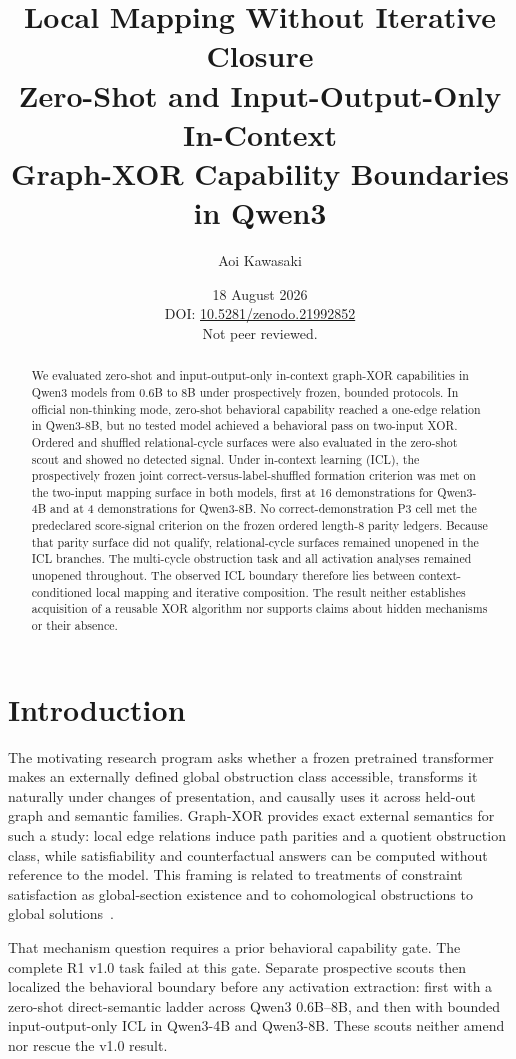 \documentclass[10pt,a4paper]{article}
\title{\textbf{Local Mapping Without Iterative Closure}\\[4pt]
\large Zero-Shot and Input-Output-Only In-Context\\
Graph-XOR Capability Boundaries in Qwen3}
\author{Aoi Kawasaki}
\date{18 August 2026\\
\small DOI: \href{https://doi.org/10.5281/zenodo.21992852}{10.5281/zenodo.21992852}\\
\small Not peer reviewed.}
\begin{document}
\maketitle

\begin{abstract}
We evaluated zero-shot and input-output-only in-context graph-XOR capabilities in Qwen3 models from 0.6B to 8B under prospectively frozen, bounded protocols. In official non-thinking mode, zero-shot behavioral capability reached a one-edge relation in Qwen3-8B, but no tested model achieved a behavioral pass on two-input XOR. Ordered and shuffled relational-cycle surfaces were also evaluated in the zero-shot scout and showed no detected signal. Under in-context learning (ICL), the prospectively frozen joint correct-versus-label-shuffled formation criterion was met on the two-input mapping surface in both models, first at 16 demonstrations for Qwen3-4B and at 4 demonstrations for Qwen3-8B. No correct-demonstration P3 cell met the predeclared score-signal criterion on the frozen ordered length-8 parity ledgers. Because that parity surface did not qualify, relational-cycle surfaces remained unopened in the ICL branches. The multi-cycle obstruction task and all activation analyses remained unopened throughout. The observed ICL boundary therefore lies between context-conditioned local mapping and iterative composition. The result neither establishes acquisition of a reusable XOR algorithm nor supports claims about hidden mechanisms or their absence.
\end{abstract}

\section{Introduction}

The motivating research program asks whether a frozen pretrained transformer makes an externally defined global obstruction class accessible, transforms it naturally under changes of presentation, and causally uses it across held-out graph and semantic families. Graph-XOR provides exact external semantics for such a study: local edge relations induce path parities and a quotient obstruction class, while satisfiability and counterfactual answers can be computed without reference to the model. This framing is related to treatments of constraint satisfaction as global-section existence and to cohomological obstructions to global solutions~\cite{oconghaile2022}.

That mechanism question requires a prior behavioral capability gate. The complete R1 v1.0 task failed at this gate. Separate prospective scouts then localized the behavioral boundary before any activation extraction: first with a zero-shot direct-semantic ladder across Qwen3 0.6B--8B, and then with bounded input-output-only ICL in Qwen3-4B and Qwen3-8B. These scouts neither amend nor rescue the v1.0 result.
\end{document}
